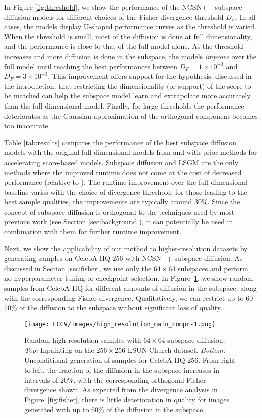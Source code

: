 \documentclass{article}
\begin{document}
In Figure \ref{fig:threshold}, we show the performance of the NCSN++ subspace diffusion models for different choices of the Fisher divergence threshold $D_F$. In all cases, the models display U-shaped performance curves as the threshold is varied. When the threshold is small, most of the diffusion is done at full dimensionality, and the performance is close to that of the full model alone. As the threshold increases and more diffusion is done in the subspace, the models \emph{improve} over the full model until reaching the best performances between $D_F =1 \times 10^{-3}$ and $D_F = 3\times 10^{-3}$. This improvement offers support for the hypothesis, discussed in the introduction, that restricting the dimensionality (or support) of the score to be matched can help the subspace model learn and extrapolate more accurately than the full-dimensional model. Finally, for large thresholds the performance deteriorates as the Gaussian approximation of the orthogonal component becomes too inaccurate.

Table \ref{tab:results} compares the performance of the best subspace diffusion models with the original full-dimensional models from \cite{song2021score} and with prior methods for accelerating score-based models. Subspace diffusion and LSGM \cite{vahdat2021score} are the only methods where the improved runtime does not come at the cost of decreased performance (relative to \cite{song2021score}). The runtime improvement over the full-dimensional baseline varies with the choice of divergence threshold; for those leading to the best sample qualities, the improvements are typically around 30\%. Since the concept of subspace diffusion is orthogonal to the techniques used by most previous work (see Section \ref{sec:background}), it can potentially be used in combination with them for further runtime improvement. 

Next, we show the applicability of our method to higher-resolution datasets by generating samples on CelebA-HQ-256 with NCSN++ subspace diffusion. As discussed in Section \ref{sec:fisher}, we use only the $64\times 64$ subspaces and perform no hyperparameter tuning or checkpoint selection. In Figure~\ref{fig:high_res}, we show random samples from CelebA-HQ for different amounts of diffusion in the subspace, along with the corresponding Fisher divergence. Qualitatively, we can restrict up to 60--70\% of the diffusion to the subspace without significant loss of quality.

\begin{figure}[t]
    \centering
    \texttt{[image: ECCV/images/high\_resolution\_main\_compr-1.png]}
    \caption{Random high resolution samples with $64\times 64$ subspace diffusion. \textit{Top:} Inpainting on the $256 \times 256$ LSUN Church dataset. \textit{Bottom:} Unconditional generation of samples for CelebA-HQ-256. From right to left, the fraction of the diffusion in the subspace increases in intervals of 20\%, with the corresponding orthogonal Fisher divergence shown. As expected from the divergence analysis in Figure~\ref{fig:fisher}, there is little deterioration in quality for images generated with up to 60\% of the diffusion in the subspace.} 
    \label{fig:high_res}
\end{figure}
\end{document}
